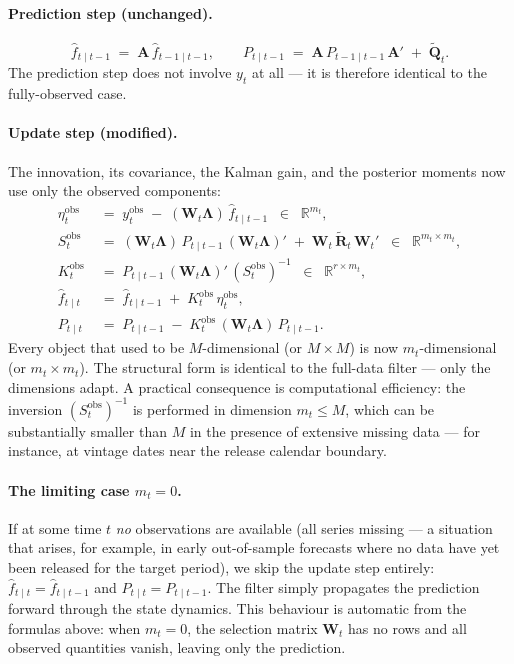 \documentclass[11pt, a4paper, oneside]{article}
\newcommand{\mL}{\boldsymbol{\Lambda}}
\begin{document}
\paragraph{Prediction step (unchanged).}
\[
\hat{f}_{t \mid t-1} \;=\; \mathbf{A}\, \hat{f}_{t-1 \mid t-1},
\qquad
P_{t \mid t-1} \;=\; \mathbf{A}\, P_{t-1 \mid t-1}\, \mathbf{A}' \;+\; \tilde{\mathbf{Q}}_t.
\]
The prediction step does not involve $y_t$ at all — it is therefore
identical to the fully-observed case.

\paragraph{Update step (modified).}
The innovation, its covariance, the Kalman gain, and the posterior
moments now use only the observed components:
\begin{align}
\eta_t^{\mathrm{obs}} &\;=\; y_t^{\mathrm{obs}} \;-\; (\mathbf{W}_t \mL)\, \hat{f}_{t \mid t-1} \;\;\in\;\; \mathbb{R}^{m_t}, \label{eq:kf-innov-missing}\\[3pt]
S_t^{\mathrm{obs}} &\;=\; (\mathbf{W}_t \mL)\, P_{t \mid t-1}\, (\mathbf{W}_t \mL)' \;+\; \mathbf{W}_t\, \tilde{\mathbf{R}}_t\, \mathbf{W}_t' \;\;\in\;\; \mathbb{R}^{m_t \times m_t}, \label{eq:kf-innov-cov-missing}\\[3pt]
K_t^{\mathrm{obs}} &\;=\; P_{t \mid t-1}\, (\mathbf{W}_t \mL)'\, (S_t^{\mathrm{obs}})^{-1} \;\;\in\;\; \mathbb{R}^{r \times m_t}, \label{eq:kf-gain-missing}\\[3pt]
\hat{f}_{t \mid t} &\;=\; \hat{f}_{t \mid t-1} \;+\; K_t^{\mathrm{obs}}\, \eta_t^{\mathrm{obs}}, \\[3pt]
P_{t \mid t} &\;=\; P_{t \mid t-1} \;-\; K_t^{\mathrm{obs}}\, (\mathbf{W}_t \mL)\, P_{t \mid t-1}.
\end{align}
Every object that used to be $M$-dimensional (or $M \times M$) is now
$m_t$-dimensional (or $m_t \times m_t$). The structural form is
identical to the full-data filter — only the dimensions adapt.
A practical consequence is computational efficiency: the inversion
$(S_t^{\mathrm{obs}})^{-1}$ is performed in dimension $m_t \leq M$,
which can be substantially smaller than $M$ in the presence of
extensive missing data — for instance, at vintage dates near the
release calendar boundary.

\paragraph{The limiting case $m_t = 0$.}
If at some time $t$ \emph{no} observations are available (all series
missing — a situation that arises, for example, in early
out-of-sample forecasts where no data have yet been released for the
target period), we skip the update step entirely:
$\hat{f}_{t \mid t} = \hat{f}_{t \mid t-1}$ and
$P_{t \mid t} = P_{t \mid t-1}$. The filter simply propagates the
prediction forward through the state dynamics. This behaviour is
automatic from the formulas above: when $m_t = 0$, the selection
matrix $\mathbf{W}_t$ has no rows and all observed quantities vanish,
leaving only the prediction.
\end{document}
